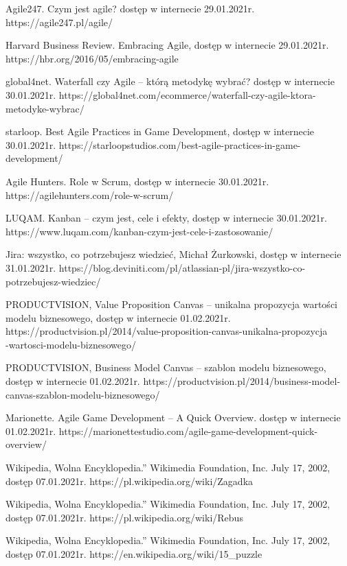 \documentclass[oneside,polski,logo]{amuthesis}
\begin{document}
\begin{thebibliography}{7}
Agile247. Czym jest agile? dostęp w internecie 29.01.2021r.
https://agile247.pl/agile/

Harvard Business Review. Embracing Agile, dostęp w internecie 29.01.2021r.
https://hbr.org/2016/05/embracing-agile

global4net. Waterfall czy Agile – którą metodykę wybrać? dostęp w internecie 30.01.2021r.
https://global4net.com/ecommerce/waterfall-czy-agile-ktora-metodyke-wybrac/

starloop. Best Agile Practices in Game Development, dostęp w internecie 30.01.2021r.
https://starloopstudios.com/best-agile-practices-in-game-development/

Agile Hunters. Role w Scrum, dostęp w internecie 30.01.2021r.
https://agilehunters.com/role-w-scrum/

LUQAM. Kanban – czym jest, cele i efekty, dostęp w internecie 30.01.2021r.
https://www.luqam.com/kanban-czym-jest-cele-i-zastosowanie/

Jira: wszystko, co potrzebujesz wiedzieć, Michał Żurkowski, dostęp w internecie 31.01.2021r.
https://blog.deviniti.com/pl/atlassian-pl/jira-wszystko-co-potrzebujesz-wiedziec/

PRODUCTVISION, Value Proposition Canvas – unikalna propozycja wartości modelu biznesowego, dostęp w internecie 01.02.2021r.
https://productvision.pl/2014/value-proposition-canvas-unikalna-propozycja\\-wartosci-modelu-biznesowego/

PRODUCTVISION, Business Model Canvas – szablon modelu biznesowego, dostęp w internecie 01.02.2021r.
https://productvision.pl/2014/business-model-canvas-szablon-modelu-biznesowego/

Marionette. Agile Game Development – A Quick Overview. dostęp w internecie 01.02.2021r.
https://marionettestudio.com/agile-game-development-quick-overview/

Wikipedia, Wolna Encyklopedia.” Wikimedia Foundation, Inc. July 17, 2002, dostęp 07.01.2021r.
https://pl.wikipedia.org/wiki/Zagadka

Wikipedia, Wolna Encyklopedia.” Wikimedia Foundation, Inc. July 17, 2002, dostęp 07.01.2021r.
https://pl.wikipedia.org/wiki/Rebus

Wikipedia, Wolna Encyklopedia.” Wikimedia Foundation, Inc. July 17, 2002, dostęp 07.01.2021r.
https://en.wikipedia.org/wiki/15\_puzzle


\end{thebibliography}
\end{document}
